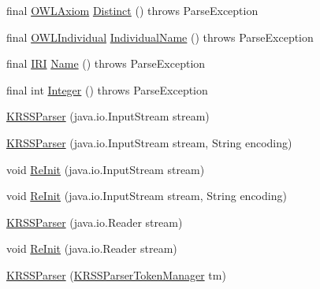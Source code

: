 \begin{DoxyCompactItemize}
\item 
final \hyperlink{interfaceorg_1_1semanticweb_1_1owlapi_1_1model_1_1_o_w_l_axiom}{O\-W\-L\-Axiom} \hyperlink{classorg_1_1coode_1_1owl_1_1krssparser_1_1_k_r_s_s_parser_a33d796cf763ad16c36e8999ab1feb55a}{Distinct} ()  throws Parse\-Exception 
\item 
final \hyperlink{interfaceorg_1_1semanticweb_1_1owlapi_1_1model_1_1_o_w_l_individual}{O\-W\-L\-Individual} \hyperlink{classorg_1_1coode_1_1owl_1_1krssparser_1_1_k_r_s_s_parser_a1a2d01031c564c4712fd735a9e153ecf}{Individual\-Name} ()  throws Parse\-Exception 
\item 
final \hyperlink{classorg_1_1semanticweb_1_1owlapi_1_1model_1_1_i_r_i}{I\-R\-I} \hyperlink{classorg_1_1coode_1_1owl_1_1krssparser_1_1_k_r_s_s_parser_a9b6dde91f44aecf574f9f7a96f4f2fa0}{Name} ()  throws Parse\-Exception 
\item 
final int \hyperlink{classorg_1_1coode_1_1owl_1_1krssparser_1_1_k_r_s_s_parser_a35e937ecd4a52ae706d5f9f873215396}{Integer} ()  throws Parse\-Exception 
\item 
\hyperlink{classorg_1_1coode_1_1owl_1_1krssparser_1_1_k_r_s_s_parser_a7ba64f8b47838173ab0bb19fc92fd406}{K\-R\-S\-S\-Parser} (java.\-io.\-Input\-Stream stream)
\item 
\hyperlink{classorg_1_1coode_1_1owl_1_1krssparser_1_1_k_r_s_s_parser_ad920ba474be282aedc402c8f055d7fdc}{K\-R\-S\-S\-Parser} (java.\-io.\-Input\-Stream stream, String encoding)
\item 
void \hyperlink{classorg_1_1coode_1_1owl_1_1krssparser_1_1_k_r_s_s_parser_ab50af3066c5c1a4f22d75cde836af90a}{Re\-Init} (java.\-io.\-Input\-Stream stream)
\item 
void \hyperlink{classorg_1_1coode_1_1owl_1_1krssparser_1_1_k_r_s_s_parser_ac32f8269d3024b518cadc1a2b70d25aa}{Re\-Init} (java.\-io.\-Input\-Stream stream, String encoding)
\item 
\hyperlink{classorg_1_1coode_1_1owl_1_1krssparser_1_1_k_r_s_s_parser_af3616c70f3c0eb64992c0b76fe9bd97a}{K\-R\-S\-S\-Parser} (java.\-io.\-Reader stream)
\item 
void \hyperlink{classorg_1_1coode_1_1owl_1_1krssparser_1_1_k_r_s_s_parser_a04853228a84ca5248c74a867efbc218d}{Re\-Init} (java.\-io.\-Reader stream)
\item 
\hyperlink{classorg_1_1coode_1_1owl_1_1krssparser_1_1_k_r_s_s_parser_a93fe8a53bc957364682f9c50b69edf35}{K\-R\-S\-S\-Parser} (\hyperlink{classorg_1_1coode_1_1owl_1_1krssparser_1_1_k_r_s_s_parser_token_manager}{K\-R\-S\-S\-Parser\-Token\-Manager} tm)
\item 

\end{DoxyCompactItemize}
